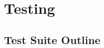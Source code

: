 \documentclass[12pt]{scrreprt}
\begin{document}
\begin{enumerate}
\begin{enumerate}
    \end{enumerate} 
\end{enumerate}






\section{Testing}




\subsection{Test Suite Outline}
\end{document}
